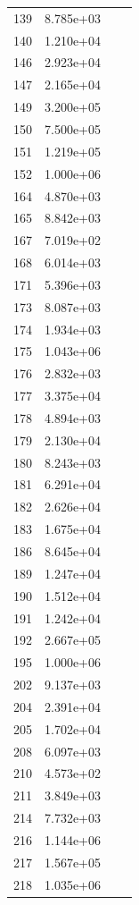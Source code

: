 \documentclass[12pt]{article}
\begin{document}
\begin{longtable}{@{}cccc@{}}
139 & 8.785e+03 &  &  \\
140 & 1.210e+04 &  &  \\
146 & 2.923e+04 &  &  \\
147 & 2.165e+04 &  &  \\
149 & 3.200e+05 &  &  \\
150 & 7.500e+05 &  &  \\
151 & 1.219e+05 &  &  \\
152 & 1.000e+06 &  &  \\
164 & 4.870e+03 &  &  \\
165 & 8.842e+03 &  &  \\
167 & 7.019e+02 &  &  \\
168 & 6.014e+03 &  &  \\
171 & 5.396e+03 &  &  \\
173 & 8.087e+03 &  &  \\
174 & 1.934e+03 &  &  \\
175 & 1.043e+06 &  &  \\
176 & 2.832e+03 &  &  \\
177 & 3.375e+04 &  &  \\
178 & 4.894e+03 &  &  \\
179 & 2.130e+04 &  &  \\
180 & 8.243e+03 &  &  \\
181 & 6.291e+04 &  &  \\
182 & 2.626e+04 &  &  \\
183 & 1.675e+04 &  &  \\
186 & 8.645e+04 &  &  \\
189 & 1.247e+04 &  &  \\
190 & 1.512e+04 &  &  \\
191 & 1.242e+04 &  &  \\
192 & 2.667e+05 &  &  \\
195 & 1.000e+06 &  &  \\
202 & 9.137e+03 &  &  \\
204 & 2.391e+04 &  &  \\
205 & 1.702e+04 &  &  \\
208 & 6.097e+03 &  &  \\
210 & 4.573e+02 &  &  \\
211 & 3.849e+03 &  &  \\
214 & 7.732e+03 &  &  \\
216 & 1.144e+06 &  &  \\
217 & 1.567e+05 &  &  \\
218 & 1.035e+06 &  &  \\

\end{longtable}
\end{document}
